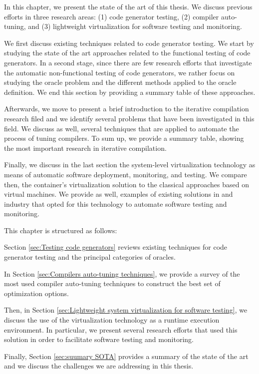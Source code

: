 
In this chapter, we present the state of the art of this thesis. We discuss previous efforts in three research areas: (1) code generator testing, (2) compiler auto-tuning, and (3) lightweight virtualization for software testing and monitoring.

We first discuss existing techniques related to code generator testing. We start by studying the state of the art approaches related to the functional testing of code generators. In a second stage, since there are few research efforts that investigate the automatic non-functional testing of code generators, we rather focus on studying the oracle problem and the different methods applied to the oracle definition. We end this section by providing a summary table of these approaches.

Afterwards, we move to present a brief introduction to the iterative compilation research filed and we identify several problems that have been investigated in this field. We discuss as well, several techniques that are applied to automate the process of tuning compilers. To sum up, we provide a summary table, showing the most important research  in iterative compilation.

Finally, we discuss in the last section the system-level virtualization technology as means of automatic software deployment, monitoring, and testing. We compare then, the container's virtualization solution to the classical approaches based on virtual machines. We provide as well, examples of existing solutions in  and industry that opted for this technology to automate software testing and monitoring.

This chapter is structured as follows: 

Section \ref{sec:Testing code generators} reviews existing techniques for code generator testing and the principal categories of oracles. 

In Section \ref{sec:Compilers auto-tuning techniques}, we provide a survey of the most used compiler auto-tuning techniques to construct the best set of optimization options. 

Then, in Section \ref{sec:Lightweight system virtualization for software testing}, we discuss the use of the virtualization technology as a runtime execution environment. In particular, we present several research efforts that used this solution in order to facilitate software testing and monitoring. 

Finally, Section \ref{sec:suumary SOTA} provides a summary of the state of the art and we discuss the challenges we are addressing in this thesis.

